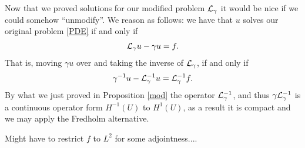 \documentclass[12pt]{article}
\newcommand{\red}[1]{{\color{red}#1}}
\begin{document}
Now that we proved solutions for our modified problem $\mathcal{L}_\gamma $ it would be nice if we could somehow ``unmodify''. We reason as follows: we have that $u$ solves our original problem  \eqref{PDE} if and only if
\begin{align*}
  \mathcal{L}_\gamma u - \gamma  u =f.
\end{align*}
That is, moving $\gamma  u$ over and taking the inverse of $\mathcal{L}_\gamma $, if and only if
\begin{align*}
  \gamma^{-1}u -\mathcal{L}_\gamma ^{-1} u = \mathcal{L}_\gamma ^{-1}f.
\end{align*}
By what we just proved in Proposition \ref{mod} the operator $\mathcal{L}_\gamma^{-1}$, and thus $ \gamma \mathcal{L}_\gamma ^{-1}$ is a continuous operator form $H^{-1}(U)$ to  $H^{1}(U)$, as a result it is compact and we may apply the Fredholm alternative.

\red{Might have to restrict $f$ to  $L^2$ for some adjointness....}

\appendix



\end{document}
